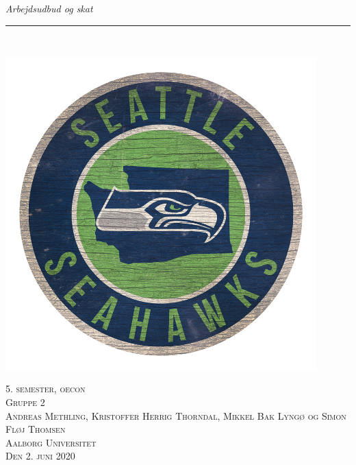 \thispagestyle{empty}
\linespread{1.1}
\begin{center}
\vspace{3cm}

\phantom{hul}

\phantom{hul}

\textsl{\Huge Arbejdsudbud og skat} \\ \vspace{1cm}

\rule{13cm}{1mm} \\ \vspace{1.5cm}
\vspace{1cm}


\includegraphics[width=0.9\textwidth]{billeder/logo sea circle.jpg}
\end{center}

\begin{flushright}
\vspace{2cm} 
\textsc{\Large 5. semester, oecon \\
Gruppe 2 \\
Andreas Methling, Kristoffer Herrig Thorndal, Mikkel Bak Lyngø og Simon Fløj Thomsen\\
Aalborg Universitet\\
Den 2. juni 2020\\}
\end{flushright}